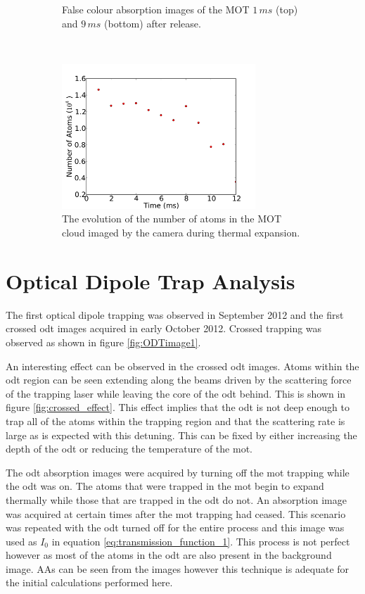 \begin{figure}[t]
\begin{subfigure}[b]{0.3\textwidth}
    \caption{False colour absorption images of the MOT $1\,\unit{ms}$ (top) and $9\,\unit{ms}$ (bottom) after release.}
    \label{fig:mot_example_images}
    \end{subfigure}~~~\begin{subfigure}[b]{0.6\textwidth}
    \centering
    \includegraphics[width=0.8\textwidth]{figs/MOT_atom_count.pdf}
    \caption{The evolution of the number of atoms in the MOT cloud imaged by the camera during thermal expansion.}
    \label{fig:mot_atom_count}
    \end{subfigure}
    \caption{}
\end{figure}

\section{Optical Dipole Trap Analysis}
The first optical dipole trapping was observed in September 2012 and the first crossed \gls{odt} images acquired in early October 2012. Crossed trapping was observed as shown in figure \ref{fig:ODTimage1}.

An interesting effect can be observed in the crossed \gls{odt} images. Atoms within the \gls{odt} region can be seen extending along the beams driven by the scattering force of the trapping laser while leaving the core of the \gls{odt} behind. This is shown in figure \ref{fig:crossed_effect}. This effect implies that the \gls{odt} is not deep enough to trap all of the atoms within the trapping region and that the scattering rate is large as is expected with this detuning. This can be fixed by either increasing the depth of the \gls{odt} or reducing the temperature of the \gls{mot}.

The \gls{odt} absorption images were acquired by turning off the \gls{mot} trapping while the \gls{odt} was on. The atoms that were trapped in the \gls{mot} begin to expand thermally while those that are trapped in the \gls{odt} do not. An absorption image was acquired at certain times after the \gls{mot} trapping had ceased. This scenario was repeated with the \gls{odt} turned off for the entire process and this image was used as $I_0$ in equation \ref{eq:transmission_function_1}. This process is not perfect however as most of the atoms in the \gls{odt} are also present in the background image. AAs can be seen from the images however this technique is adequate for the initial calculations performed here.

